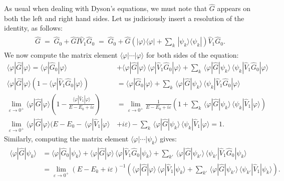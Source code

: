 \documentclass[pra,12pt]{revtex4}
\begin{document}
As usual when dealing with Dyson's equations, we must note that
$\hat{G}$ appears on both the left and right hand sides.  Let us
judiciously insert a resolution of the identity, as follows:
\begin{align}
  \begin{aligned}
    \hat{G} \;=\; \hat{G}_0 + \hat{G} \hat{I} \hat{V}_1 \hat{G}_0
    \;=\; \hat{G}_0 + \hat{G} \left(|\varphi\rangle\langle\varphi|
    + \sum_k\, |\psi_k\rangle\langle\psi_k|\right) \hat{V}_1 \hat{G}_0.
  \end{aligned}
\end{align}
We now compute the matrix element
$\langle\varphi|\cdots|\varphi\rangle$ for both sides of the equation:
\begin{align}
    \langle\varphi|\hat{G}|\varphi\rangle = \langle\varphi|\hat{G}_0|\varphi\rangle &+ \langle\varphi|\hat{G}|\varphi\rangle \, \langle\varphi|\hat{V}_1 \hat{G}_0|\varphi\rangle + \sum_k\, \langle\varphi|\hat{G}|\psi_k\rangle \, \langle\psi_k| \hat{V}_1 \hat{G}_0|\varphi\rangle \nonumber\\
    \langle\varphi|\hat{G}|\varphi\rangle \left(1 - \langle\varphi|\hat{V}_1 \hat{G}_0|\varphi\rangle\right) &= \langle\varphi|\hat{G}_0|\varphi\rangle + \sum_k \, \langle\varphi|\hat{G}|\psi_k\rangle \, \langle\psi_k| \hat{V}_1 \hat{G}_0|\varphi\rangle \nonumber\\
    \lim_{\varepsilon\rightarrow0^+}
    \langle\varphi|\hat{G}|\varphi\rangle \left(1 - \frac{\langle\varphi|\hat{V}_1|\varphi\rangle}{E - E_0 + i\varepsilon}\right) &= \lim_{\varepsilon\rightarrow0^+} \frac{1}{E  - E_0 + i\varepsilon} \left(1+ \sum_k \, \langle\varphi|\hat{G}|\psi_k\rangle \, \langle\psi_k| \hat{V}_1|\varphi\rangle \right) \nonumber\\
    \lim_{\varepsilon\rightarrow0^+} \langle\varphi|\hat{G}|\varphi\rangle \Big(E - E_0 -\, \langle\varphi|\hat{V}_1|\varphi\rangle \, & + i\varepsilon\Big) - \sum_k\, \langle\varphi|\hat{G}|\psi_k\rangle \, \langle\psi_k| \hat{V}_1|\varphi\rangle = 1. \label{psiGphi}
\end{align}
Similarly, computing the matrix element
$\langle\varphi|\cdots|\psi_k\rangle$ gives:
\begin{align*}
  \begin{aligned}
\langle\varphi|\hat{G}|\psi_k\rangle &= \langle\varphi|\hat{G}_0|\psi_k\rangle + \langle\varphi|\hat{G}|\varphi\rangle \, \langle\varphi|\hat{V}_1 \hat{G}_0|\psi_k\rangle + \sum_{k'}\, \langle\varphi|\hat{G}|\psi_{k'}\rangle \, \langle\psi_{k'}| \hat{V}_1 \hat{G}_0|\psi_k\rangle \\
&= \lim_{\varepsilon\rightarrow0^+} \left(E-E_k+i\varepsilon\right)^{-1} \left(\langle\varphi|\hat{G}|\varphi\rangle \, \langle\varphi|\hat{V}_1|\psi_k\rangle + \sum_{k'}\, \langle\varphi|\hat{G}|\psi_{k'}\rangle \, \langle\psi_{k'}| \hat{V}_1|\psi_k\rangle\right).\end{aligned}
\end{align*}
\end{document}

